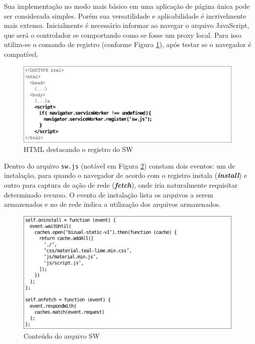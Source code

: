 \documentclass[12pt]{article}
\begin{document}
Sua implementação no modo mais básico em uma aplicação de página única pode ser considerada simples. Porém sua versatilidade e aplicabilidade é incrivelmente mais extensa. Inicialmente é necessário informar ao navegar o arquivo JavaScript, que será o controlador se comportando como se fosse um proxy local. Para isso utiliza-se o comando de registro (conforme Figura \ref{fig:swregister}), após testar se o navegador é compatível.

\begin{figure}[ht]
\centering
\includegraphics[width=.85\textwidth,keepaspectratio]{figures/html.pdf}
\caption{HTML destacando o registro do SW}
\label{fig:swregister}
\end{figure}

Dentro do arquivo \texttt{sw.js} (notável em Figura \ref{fig:swjs}) constam dois eventos: um de instalação, para quando o navegador de acordo com o registro instala (\textbf{\textit{install}}) e outro para captura de ação de rede (\textbf{\textit{fetch}}), onde iria naturalmente requisitar determinado recurso. O evento de instalação lista os arquivos a serem armazenados e no de rede indica a utilização dos arquivos armazenados.

\begin{figure}[ht]
\centering
\includegraphics[width=.85\textwidth,keepaspectratio]{figures/sw.pdf}
\caption{Conteúdo do arquivo SW}
\label{fig:swjs}
\end{figure}
\end{document}
